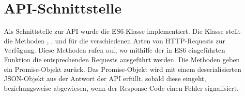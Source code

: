 \section{API-Schnittstelle}
\label{sec:f_api_schnittstelle}

Als Schnittstelle zur API wurde die ES6-Klasse  implementiert.  Die
Klasse stellt die Methoden , , 
und  für die verschiedenen Arten von HTTP-Requests zur
Verfügung.  Diese Methoden rufen  auf, wo mithilfe der in
ES6 eingeführten Funktion  die entsprechenden Requests
ausgeführt werden.  Die Methoden geben ein Promise-Objekt zurück.  Das
Promise-Objekt wird mit einem deserialisierten JSON-Objekt aus der Antwort der
API erfüllt, sobald diese eingeht, beziehungsweise abgewiesen, wenn der
Response-Code einen Fehler signalisiert.

